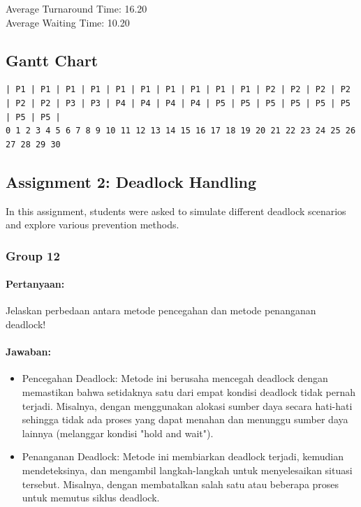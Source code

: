 \documentclass[12pt]{article}
\begin{document}
Average Turnaround Time: 16.20 \\
Average Waiting Time: 10.20

\subsection*{Gantt Chart}

\begin{verbatim}
| P1 | P1 | P1 | P1 | P1 | P1 | P1 | P1 | P1 | P1 | P2 | P2 | P2 | P2 | P2 | P2 | P3 | P3 | P4 | P4 | P4 | P4 | P5 | P5 | P5 | P5 | P5 | P5 | P5 | P5 |
0 1 2 3 4 5 6 7 8 9 10 11 12 13 14 15 16 17 18 19 20 21 22 23 24 25 26 27 28 29 30
\end{verbatim}




\subsection{Assignment 2: Deadlock Handling}
In this assignment, students were asked to simulate different deadlock scenarios and explore various prevention methods.


\subsubsection{Group 12}

\paragraph{Pertanyaan:} Jelaskan perbedaan antara metode pencegahan dan metode penanganan deadlock!

\paragraph{Jawaban:} 
\begin{itemize}
    \item Pencegahan Deadlock: Metode ini berusaha mencegah deadlock dengan memastikan bahwa setidaknya satu dari empat kondisi deadlock tidak pernah terjadi. Misalnya, dengan menggunakan alokasi sumber daya secara hati-hati sehingga tidak ada proses yang dapat menahan dan menunggu sumber daya lainnya (melanggar kondisi "hold and wait").

    \item Penanganan Deadlock: Metode ini membiarkan deadlock terjadi, kemudian mendeteksinya, dan mengambil langkah-langkah untuk menyelesaikan situasi tersebut. Misalnya, dengan membatalkan salah satu atau beberapa proses untuk memutus siklus deadlock.
\end{itemize}
\end{document}
